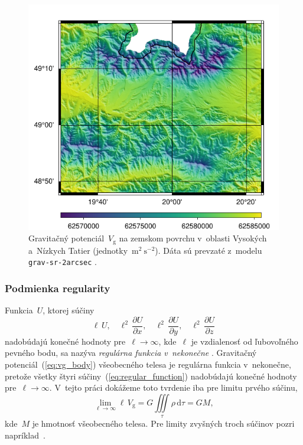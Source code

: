 \documentclass[a4paper, 12pt]{book}
\newcommand{\diff}{\mathrm d}
\newcommand{\gidx}{\mathrm g}
\begin{document}
\begin{figure}
\centering
\includegraphics{./fig-vg-grav-sr-2arcsec.pdf}
\caption{Gravitačný potenciál~$V_\gidx$ na zemskom povrchu v~oblasti Vysokých
a~Nízkych Tatier (jednotky~$\mathrm{m}^2 \ \mathrm{s}^{-2}$).  Dáta sú prevzaté
z~modelu \texttt{grav-sr-2arcsec} \parencite{GravSR2arcsec}.}
\label{fig:vg_grav_sr_2arcsec}
\end{figure}

\subsubsection{Podmienka regularity}

Funkcia~$U$, ktorej súčiny
%
\begin{equation}
\label{eq:regular_function}
\ell \, U{,} \quad \ell^2 \, \frac{\partial U}{\partial x}{,} \quad \ell^2 \, 
\frac{\partial U}{\partial y}{,} \quad \ell^2 \, \frac{\partial U}{\partial z}
\end{equation}
%
nadobúdajú konečné hodnoty pre~$\ell \rightarrow \infty$, kde~$\ell$ je 
vzdialenosť od ľubovoľného pevného bodu, sa nazýva \emph{regulárna funkcia 
v~nekonečne} \parencite{Kellogg1967,Pick1973}.  Gravitačný 
potenciál~(\ref{eq:vg_body}) všeobecného telesa je regulárna funkcia 
v~nekonečne, pretože všetky štyri súčiny~(\ref{eq:regular_function}) nadobúdajú 
konečné hodnoty pre~$\ell \rightarrow \infty$.  V~tejto práci dokážeme toto 
tvrdenie iba pre limitu prvého súčinu,
%
\begin{equation}
\label{eq:vg_regular}
\lim_{\ell \rightarrow \infty} \ell \, V_\gidx = G \iiint\limits_{\tau} \rho \, 
\diff\tau = GM{,}
\end{equation}
%
kde~$M$ je hmotnosť všeobecného telesa.  Pre limity zvyšných troch súčinov 
pozri napríklad~\textcite{Pick1973}.
\end{document}
